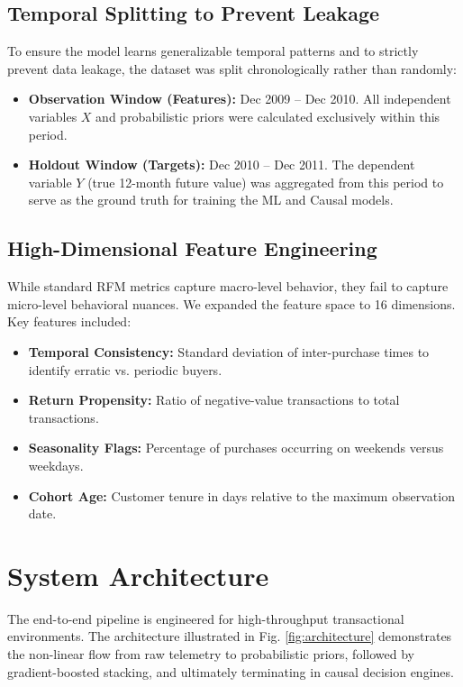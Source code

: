 \documentclass[10pt,conference]{IEEEtran}
\begin{document}
\subsection{Temporal Splitting to Prevent Leakage}
To ensure the model learns generalizable temporal patterns and to strictly prevent data leakage, the dataset was split chronologically rather than randomly:
\begin{itemize}
    \item \textbf{Observation Window (Features):} Dec 2009 -- Dec 2010. All independent variables $X$ and probabilistic priors were calculated exclusively within this period.
    \item \textbf{Holdout Window (Targets):} Dec 2010 -- Dec 2011. The dependent variable $Y$ (true 12-month future value) was aggregated from this period to serve as the ground truth for training the ML and Causal models.
\end{itemize}

\subsection{High-Dimensional Feature Engineering}
While standard RFM metrics capture macro-level behavior, they fail to capture micro-level behavioral nuances. We expanded the feature space to 16 dimensions. Key features included:
\begin{itemize}
    \item \textbf{Temporal Consistency:} Standard deviation of inter-purchase times to identify erratic vs. periodic buyers.
    \item \textbf{Return Propensity:} Ratio of negative-value transactions to total transactions.
    \item \textbf{Seasonality Flags:} Percentage of purchases occurring on weekends versus weekdays.
    \item \textbf{Cohort Age:} Customer tenure in days relative to the maximum observation date.
\end{itemize}

\section{System Architecture}

The end-to-end pipeline is engineered for high-throughput transactional environments. The architecture illustrated in Fig. \ref{fig:architecture} demonstrates the non-linear flow from raw telemetry to probabilistic priors, followed by gradient-boosted stacking, and ultimately terminating in causal decision engines.
\end{document}
